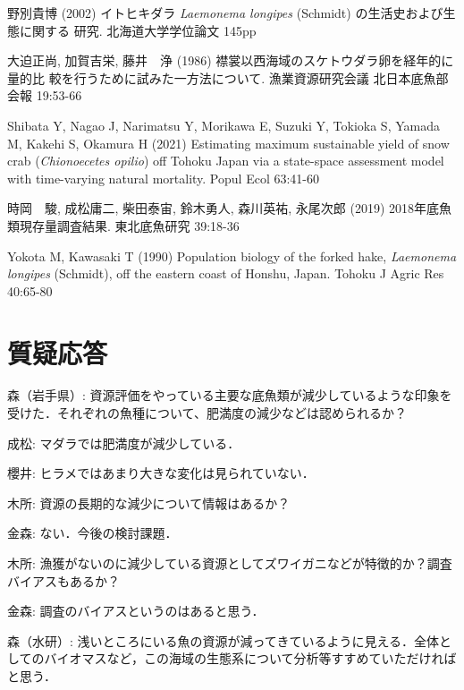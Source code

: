 \documentclass[11pt]{article} %
\begin{document}
\begin{linenumbers}
\hangindent=30pt
\noindent
野別貴博 (2002) イトヒキダラ \textit{Laemonema longipes} (Schmidt) の生活史および生態に関する
研究. 北海道大学学位論文 145pp

\hangindent=30pt
\noindent
大迫正尚, 加賀吉栄, 藤井　浄 (1986) 襟裳以西海域のスケトウダラ卵を経年的に量的比
較を行うために試みた一方法について. 漁業資源研究会議 北日本底魚部会報 19:53-66


\hangindent=30pt
\noindent
Shibata Y, Nagao J, Narimatsu Y, Morikawa E, Suzuki Y, Tokioka S, Yamada M, Kakehi S, 
Okamura H (2021) Estimating maximum sustainable yield of snow crab (\textit{Chionoecetes opilio}) off Tohoku Japan via a state-space assessment model with time-varying natural mortality. Popul Ecol 63:41-60

\hangindent=30pt
\noindent
時岡　駿, 成松庸二, 柴田泰宙, 鈴木勇人, 森川英祐, 永尾次郎 (2019) 2018年底魚類現存量調査結果. 東北底魚研究 39:18-36

\hangindent=30pt
\noindent
Yokota M, Kawasaki T (1990) Population biology of the forked hake, \textit{Laemonema longipes} 
 (Schmidt), off the eastern coast of Honshu, Japan. Tohoku J Agric Res 40:65-80 
 
 
\section{質疑応答}
森（岩手県）: 資源評価をやっている主要な底魚類が減少しているような印象を受けた．それぞれの魚種について、肥満度の減少などは認められるか？

成松: マダラでは肥満度が減少している．

櫻井: ヒラメではあまり大きな変化は見られていない．

木所: 資源の長期的な減少について情報はあるか？  

金森: ない．今後の検討課題．

木所: 漁獲がないのに減少している資源としてズワイガニなどが特徴的か？調査バイアスもあるか？

金森: 調査のバイアスというのはあると思う．

森（水研）: 浅いところにいる魚の資源が減ってきているように見える．全体としてのバイオマスなど，この海域の生態系について分析等すすめていただければと思う．


\end{linenumbers}
\end{document}
